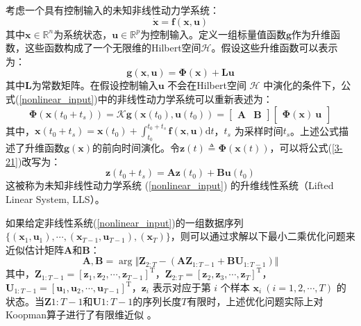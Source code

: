 \documentclass[lang=chs, degree=master, blindreview=false, winfonts=true]{yanputhesis}
\begin{document}
考虑一个具有控制输入的未知非线性动力学系统： \begin{equation} \dot{\bm{x}} = \bm{f}(\bm{x},\bm{u}) \label{nonlinear_input} \end{equation} 其中$\bm{x} \in \mathbb{R}^n$为系统状态，$\bm{u} \in \mathbb{R}^p$为控制输入。定义一组标量值函数$\bm{g}$作为升维函数，这些函数构成了一个无限维的Hilbert空间$\mathcal{H}$。假设这些升维函数可以表示为： \begin{equation} \bm{g}(\bm{x},\bm{u}) = \bm{\Phi}(\bm{x}) + \bm{L}\bm{u} \end{equation} 其中$\bm{L}$为常数矩阵。在假设控制输入$\bm{u}$ 不会在Hilbert空间 $\mathcal{H}$ 中演化的条件下，公式(\ref{nonlinear_input})中的非线性动力学系统可以重新表述为： \begin{equation} \bm{\Phi}(\bm{x}(t_0+t_s)) = \bm{\mathcal{K}} \bm{g}(\bm{x}(t_0), \bm{u}(t_0)) = \begin{bmatrix} \bm{A} & \bm{B} \end{bmatrix} \begin{bmatrix} \bm{\Phi}(\bm{x}) \ \bm{u} \end{bmatrix}
\label{3-21} \end{equation} 其中，$\bm{x}(t_0+t_s)=\bm{x}(t_0)+\int_{t_0}^{t_0+t_s}\bm{f}(\bm{x},\bm{u}){\mathrm{d}t}$，$t_s$ 为采样时间$t_s$。上述公式描述了升维函数$\bm{g}(\bm{x})$的前向时间演化。令$\bm{z}(t) \triangleq \bm{\Phi}(\bm{x}(t))$，可以将公式(\ref{3-21})改写为： \begin{equation} \bm{z}(t_0 + t_s) = \bm{A}\bm{z}(t_0) + \bm{B}\bm{u}(t_0) \label{lls} \end{equation} 这被称为未知非线性动力学系统 (\ref{nonlinear_input}) 的升维线性系统（Lifted Linear System, LLS）。

如果给定非线性系统(\ref{nonlinear_input})的一组数据序列 $\{(\bm{x}_1,\bm{u}_1),\cdots,(\bm{x}_{T-1},\bm{u}_{T-1}),(\bm{x}_T)\}$，则可以通过求解以下最小二乘优化问题来近似估计矩阵$\bm{A}$和$\bm{B}$：
\begin{equation}
	\bm{A},\bm{B} = \mathop{\arg\min\limits_{\bm{A},\bm{B}}} \Vert \bm{Z}_{2:T} - (\bm{A}\bm{Z}_{1:T-1}+\bm{B}\bm{U}_{1:T-1}) \Vert \label{LS_AB}
\end{equation} 
其中，$\bm{Z}_{1:T-1}= [ \bm{z}_1,\bm{z}_2,\cdots,\bm{z}_{T-1} ]^\mathrm{T}$，$\bm{Z}_{2:T}= [\bm{z}_2,\bm{z}_3,\cdots,\bm{z}_{T}]^\mathrm{T}$，$\bm{U}_{1:T-1}= [\bm{u}_1,\bm{u}_2,\cdots,\bm{u}_{T-1}]^\mathrm{T}$，$\bm{z}_i$ 表示对应于第 $i$ 个样本 $\bm{x}_i\ (i=1,2,\cdots,T)$ 的状态。当$\bm{Z}{1:T-1}$和$\bm{U}{1:T-1}$的序列长度$T$有限时，上述优化问题实际上对Koopman算子进行了有限维近似 \cite{Hao2024}。
\end{document}
